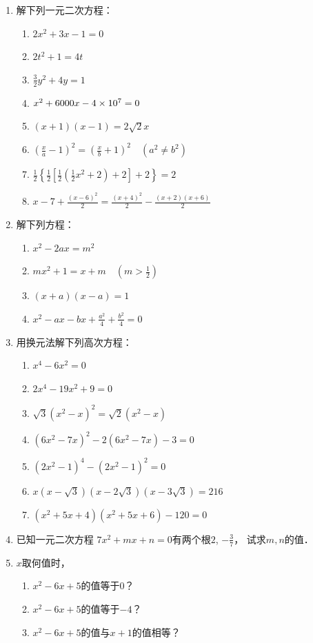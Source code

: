 \begin{enumerate}
\item 解下列一元二次方程：
\begin{enumerate}
    \item $2x^2+3x-1=0$
    \item $2t^2+1=4t$
    \item $\frac{3}{2}y^2+4y=1$
    \item $x^2+6000x-4\times 10^7=0$
    \item $(x+1)(x-1)=2\sqrt{2}x$
    \item $\left(\frac{x}{a}-1\right)^2=\left(\frac{x}{b}+1\right)^2\quad (a^2\ne b^2)$
    \item $\frac{1}{2}\left\{\frac{1}{2}\left[\frac{1}{2}\left(\frac{1}{2}x^2+2\right)+2\right]+2\right\}=2$
    \item $x-7+\frac{(x-6)^2}{2}=\frac{(x+4)^2}{2}-\frac{(x+2)(x+6)}{2}$
\end{enumerate}

\item 解下列方程：
\begin{enumerate}
    \item $x^2-2ax=m^2$
    \item $mx^2+1=x+m\quad (m>\frac{1}{2})$
    \item $(x+a)(x-a)=1$
    \item $x^2-ax-bx+\frac{a^2}{4}+\frac{b^2}{4}=0$
\end{enumerate}

\item 用换元法解下列高次方程：
\begin{enumerate}
    \item $x^4-6x^2=0$
    \item $2x^4-19x^2+9=0$
    \item $\sqrt{3}(x^2-x)^2=\sqrt{2}(x^2-x)$
    \item $(6x^2-7x)^2-2(6x^2-7x)-3=0$
    \item $(2x^2-1)^4-(2x^2-1)^2=0$
    \item $x\left(x-\sqrt{3}\right)\left(x-2\sqrt{3}\right)\left(x-3\sqrt{3}\right)=216$
    \item $(x^2+5x+4)(x^2+5x+6)-120=0$
\end{enumerate}

\item 已知一元二次方程
$7x^2+mx+n=0$有两个根$2$, $-\frac{3}{7}$，
试求$m,n$的值．

\item $x$取何值时，
\begin{enumerate}
    \item $x^2-6x+5$的值等于0？
    \item $x^2-6x+5$的值等于$-4$？
    \item $x^2-6x+5$的值与$x+1$的值相等？
\end{enumerate}


\end{enumerate}
